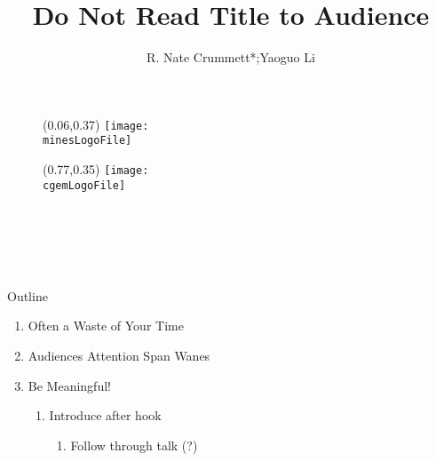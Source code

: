 \documentclass[dark]{cgem-presentation}
\title{Do Not Read Title to Audience}
\author{R. Nate Crummett*;Yaoguo Li}
\begin{document}
  \begin{frame}[plain]
    \begin{figure}
      \begin{textblock*}{2.05cm}(0.06\paperwidth,0.37\paperheight)
        \texttt{[image: \\minesLogoFile]}
      \end{textblock*}
    \end{figure}
    \begin{figure}
      \begin{textblock*}{2.85cm}(0.77\paperwidth,0.35\paperheight)
        \texttt{[image: \\cgemLogoFile]}
      \end{textblock*}
    \end{figure}

    \begin{center}
      { \Huge {}} \\ [1cm]
      \textcolor{SecondColor}{
        \LARGE
      } \\ [1.2cm]
      \textit{
        \textcolor{SecondColor}{  } \\ [2mm]
        \normalsize
         \\ [-5mm]
      }
    \end{center}
  \end{frame}

  \begin{frame}{Outline}
    \begin{enumerate}
      \item Often a Waste of Your Time
      \item Audiences Attention Span Wanes
      \item Be Meaningful! \\[1mm]
      \begin{enumerate}
        \item Introduce after hook \\[2mm]
        \begin{enumerate}
          \item Follow through talk (?)
        \end{enumerate}
      \end{enumerate}
    \end{enumerate}
  \end{frame}
 
\end{document}

